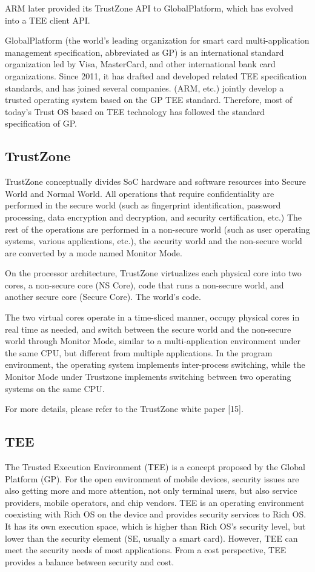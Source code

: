 \documentclass[journal]{IEEEtran}
\begin{document}
ARM later provided its TrustZone API to GlobalPlatform, which has evolved into a TEE client API.

GlobalPlatform (the world's leading organization for smart card multi-application management specification, abbreviated as GP) is an international standard organization led by Visa, MasterCard, and other international bank card organizations. Since 2011, it has drafted and developed related TEE specification standards, and has joined several companies. (ARM, etc.) jointly develop a trusted operating system based on the GP TEE standard. Therefore, most of today's Trust OS based on TEE technology has followed the standard specification of GP.

\subsection{TrustZone}
TrustZone conceptually divides SoC hardware and software resources into Secure World and Normal World. All operations that require confidentiality are performed in the secure world (such as fingerprint identification, password processing, data encryption and decryption, and security certification, etc.) The rest of the operations are performed in a non-secure world (such as user operating systems, various applications, etc.), the security world and the non-secure world are converted by a mode named Monitor Mode.

On the processor architecture, TrustZone virtualizes each physical core into two cores, a non-secure core (NS Core), code that runs a non-secure world, and another secure core (Secure Core). The world's code.

The two virtual cores operate in a time-sliced manner, occupy physical cores in real time as needed, and switch between the secure world and the non-secure world through Monitor Mode, similar to a multi-application environment under the same CPU, but different from multiple applications. In the program environment, the operating system implements inter-process switching, while the Monitor Mode under Trustzone implements switching between two operating systems on the same CPU.

For more details, please refer to the TrustZone white paper [15].

\subsection{TEE}
The Trusted Execution Environment (TEE) is a concept proposed by the Global Platform (GP). For the open environment of mobile devices, security issues are also getting more and more attention, not only terminal users, but also service providers, mobile operators, and chip vendors. TEE is an operating environment coexisting with Rich OS  on the device and provides security services to Rich OS. It has its own execution space, which is higher than Rich OS's security level, but lower than the security element (SE, usually a smart card). However, TEE can meet the security needs of most applications. From a cost perspective, TEE provides a balance between security and cost.
 
\end{document}
